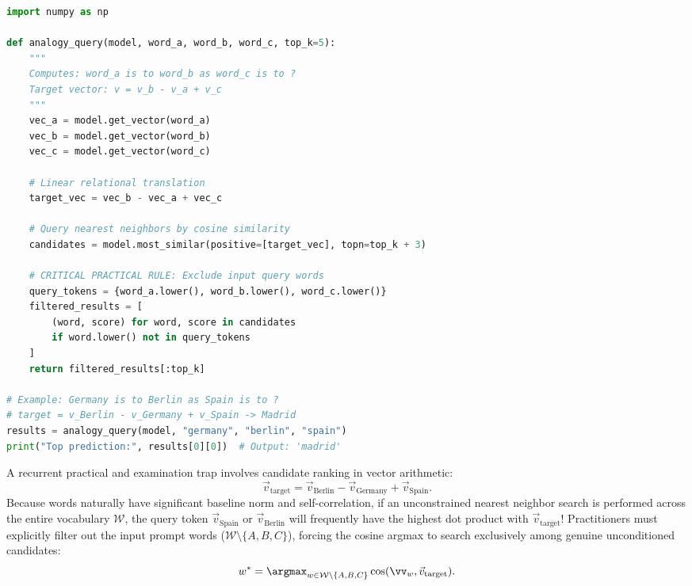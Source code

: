 \documentclass[../../main.tex]{subfiles}
\begin{document}
\begin{lstlisting}[language=Python, caption={Implementation of relational vector arithmetic and candidate filtering in Python \cite{giobergia2024gist}.}, label={lst:giobergia_gist}]
import numpy as np

def analogy_query(model, word_a, word_b, word_c, top_k=5):
    """
    Computes: word_a is to word_b as word_c is to ?
    Target vector: v = v_b - v_a + v_c
    """
    vec_a = model.get_vector(word_a)
    vec_b = model.get_vector(word_b)
    vec_c = model.get_vector(word_c)
    
    # Linear relational translation
    target_vec = vec_b - vec_a + vec_c
    
    # Query nearest neighbors by cosine similarity
    candidates = model.most_similar(positive=[target_vec], topn=top_k + 3)
    
    # CRITICAL PRACTICAL RULE: Exclude input query words
    query_tokens = {word_a.lower(), word_b.lower(), word_c.lower()}
    filtered_results = [
        (word, score) for word, score in candidates 
        if word.lower() not in query_tokens
    ]
    return filtered_results[:top_k]

# Example: Germany is to Berlin as Spain is to ?
# target = v_Berlin - v_Germany + v_Spain -> Madrid
results = analogy_query(model, "germany", "berlin", "spain")
print("Top prediction:", results[0][0])  # Output: 'madrid'
\end{lstlisting}

\begin{examinsight}
A recurrent practical and examination trap involves candidate ranking in vector arithmetic:
\begin{equation}
\label{eq:target_vector_exam}
\vec{v}_{\text{target}} = \vec{v}_{\text{Berlin}} - \vec{v}_{\text{Germany}} + \vec{v}_{\text{Spain}}.
\end{equation}
Because words naturally have significant baseline norm and self-correlation, if an unconstrained nearest neighbor search is performed across the entire vocabulary $\mathcal{W}$, the query token $\vec{v}_{\text{Spain}}$ or $\vec{v}_{\text{Berlin}}$ will frequently have the highest dot product with $\vec{v}_{\text{target}}$!
Practitioners must explicitly filter out the input prompt words ($\mathcal{W} \setminus \{A, B, C\}$), forcing the cosine argmax to search exclusively among genuine unconditioned candidates:
\begin{equation}
\label{eq:filtered_argmax}
w^* = \argmax_{w \in \mathcal{W} \setminus \{A, B, C\}} \cos(\vv_w, \vec{v}_{\text{target}}).
\end{equation}
\end{examinsight}
\end{document}
